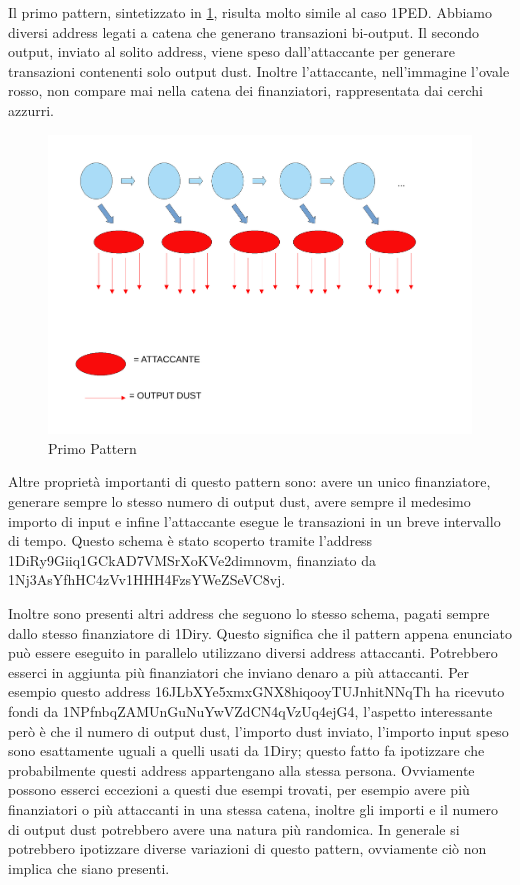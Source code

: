 Il primo pattern, sintetizzato in \ref{fig:schema1}, risulta molto simile al caso 1PED. Abbiamo diversi address legati a catena che generano transazioni bi-output. Il secondo output, inviato al solito address, viene speso dall'attaccante per generare transazioni contenenti solo output dust. Inoltre l'attaccante, nell'immagine l'ovale rosso, non compare mai nella catena dei finanziatori, rappresentata dai cerchi azzurri.
\begin{figure}[h!]
    \centering
    \includegraphics[scale=0.4]{Images/dust_attack1.pdf}
    \caption{Primo Pattern}
    \label{fig:schema1}
\end{figure}
\FloatBarrier
Altre proprietà importanti di questo pattern sono: avere un unico finanziatore, generare sempre lo stesso numero di output dust, avere sempre il medesimo importo di input e infine l'attaccante esegue le transazioni in un breve intervallo di tempo. Questo schema è stato scoperto tramite l'address 1DiRy9Giiq1GCkAD7VMSrXoKVe2dimnovm, finanziato da 1Nj3AsYfhHC4zVv1HHH4FzsYWeZSeVC8vj. 

Inoltre sono presenti altri address che seguono lo stesso schema, pagati sempre dallo stesso finanziatore di 1Diry. Questo significa che il pattern appena enunciato può essere eseguito in parallelo utilizzano diversi address attaccanti. Potrebbero esserci in aggiunta più finanziatori che inviano denaro a più attaccanti. Per esempio questo address 16JLbXYe5xmxGNX8hiqooyTUJnhitNNqTh ha ricevuto fondi da 1NPfnbqZAMUnGuNuYwVZdCN4qVzUq4ejG4, l'aspetto interessante però è che il numero di output dust, l'importo dust inviato, l'importo input speso sono esattamente uguali a quelli usati da 1Diry; questo fatto fa ipotizzare che probabilmente questi address appartengano alla stessa persona. Ovviamente possono esserci eccezioni a questi due esempi trovati, per esempio avere più finanziatori o più attaccanti in una stessa catena, inoltre gli importi e il numero di output dust potrebbero avere una natura più randomica. In generale si potrebbero ipotizzare diverse variazioni di questo pattern, ovviamente ciò non implica che siano presenti.

